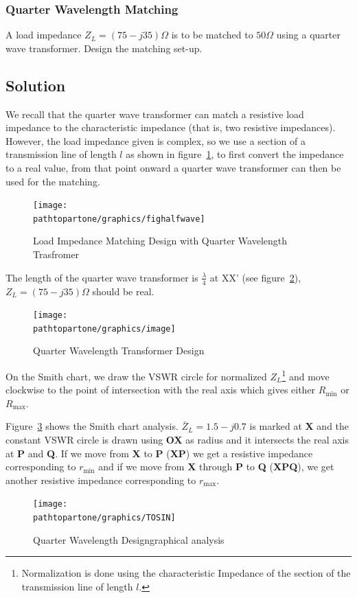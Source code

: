 \begin{exmp}
\subsubsection*{Quarter Wavelength Matching}
A load impedance $Z_{L}=(75-j35)\varOmega$ is to be matched to $50\varOmega$ using a quarter wave transformer. Design the matching set-up. 

\subsection*{Solution}
We recall that the quarter wave transformer can match a resistive load impedance to the characteristic impedance (that is, two resistive impedances). However, the load impedance given is complex, so we use a section of a transmission line of length $l$ as shown in figure~\ref{fig;fighalfwave}, to first convert the impedance to a real value, from that point onward a quarter wave transformer can then be used for the matching.
\begin{figure}[h]
\centering
\texttt{[image: \\pathtopartone/graphics/fighalfwave]}
\caption{Load Impedance Matching Design with Quarter Wavelength Trasfromer}
\label{fig;fighalfwave}
\end{figure}

The length of the quarter wave transformer is $\frac{\lambda}{4}$ at XX' (see figure~\ref{fig:image}), $Z_L = (75-j35)\varOmega$ should be real.
\begin{figure}[h]
\centering
\texttt{[image: \\pathtopartone/graphics/image]}
\caption{Quarter Wavelength Transformer Design}
\label{fig:image}
\end{figure}

On the Smith chart, we draw the VSWR circle for normalized $Z_{L}$\footnote{
Normalization is done using the characteristic Impedance of the section of the transmission line of length $l$.
} and move clockwise to the point of intersection with the real axis which gives either $R_\min$ or $R_\max$.

Figure~\ref{fig:tosin} shows the Smith chart analysis. $\bar{Z}_L=1.5-j0.7$ is marked at \textbf{X} and the constant VSWR circle is drawn using \textbf{OX} as radius and it intersects the real axis at \textbf{P} and \textbf{Q}. If we move from \textbf{X} to \textbf{P} (\textbf{XP}) we get a resistive impedance corresponding to $r_\min$ and if we move from \textbf{X} through \textbf{P} to \textbf{Q} (\textbf{XPQ}), we get another resistive impedance corresponding to $r_\max$.
\begin{figure}[h]
\centering
\texttt{[image: \\pathtopartone/graphics/TOSIN]}
\caption{Quarter Wavelength Design\textemdash\;graphical analysis}
\label{fig:tosin}
\end{figure}


\end{exmp}
